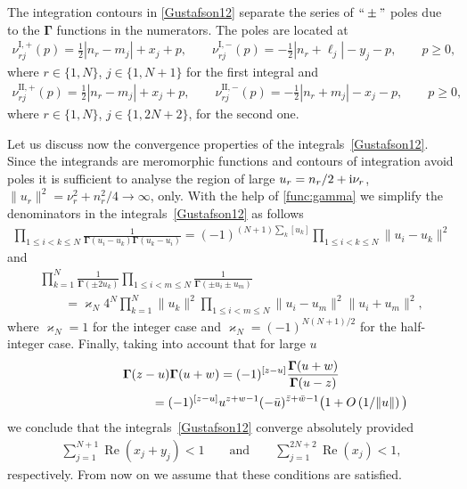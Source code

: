 \documentclass[pdftex]{sigma}
\numberwithin{equation}{section}
\begin{document}
The integration contours in \eqref{Gustafson12} separate the series of $``\pm"$ poles due to the $\boldsymbol \Gamma$ functions in the numerators. The poles are located at
\begin{gather}\label{poles-I}
\nu^{\text{I},+}_{rj}(p)=\frac12{|n_r-m_j|} +x_j +p, \qquad \nu^{\text{I},-}_{rj}(p)=-\frac12{|n_r+\ell_j|} -y_j -p,
\qquad p\geq 0,
\end{gather}
where $r\in\{1, N\}$, $j\in\{1,N+1\}$ for the first integral and
\begin{gather*}
\nu^{\text{II},+}_{rj}(p)=\frac12{|n_r-m_j|} +x_j +p, \qquad \nu^{\text{II},-}_{rj}(p)=-\frac12{|n_r+m_j|} -x_j -p,\qquad p\geq 0,
\end{gather*}
where $r\in\{1, N\}$, $j\in\{1,2N+2\}$, for the second one.

Let us discuss now the convergence properties of the integrals~\eqref{Gustafson12}. Since the integrands are meromorphic functions and contours of integration avoid poles
it is sufficient to analyse the region of large $u_r=n_r/2+ {\rm i}\nu_r$, $ \|u_r\|^2=\nu_r^2+n_r^2/4 \to\infty$, only.
With the help of \eqref{func:gamma} we simplify the denominators in the integrals~\eqref{Gustafson12} as follows
\begin{gather}\label{den1}
\prod_{1\leq i<k\leq N} \frac1{\boldsymbol{\Gamma}(u_i- u_k)\boldsymbol{\Gamma}(u_k- u_i)} = (-1)^{(N+1)\sum_k [u_k] } \prod_{1\leq i<k\leq N}\|u_i-u_k\|^2
\end{gather}
and
\begin{gather}
\prod_{k=1}^{N}\frac1{\boldsymbol{\Gamma}(\pm 2u_k)} \prod_{1\leq i<m\leq N}\frac1{\boldsymbol \Gamma (\pm u_i\pm u_m)}\nonumber\\
\qquad{} =\varkappa_N 4^{N} \prod_{k=1}^N \|u_k\|^2
\prod_{1\leq i<m\leq N}\|u_i-u_m\|^2\|u_i+u_m\|^2,\label{den2}
\end{gather}
where $\varkappa_N=1$ for the integer case and $\varkappa_N=(-1)^{N(N+1)/2}$ for the half-integer case. Finally, taking
into account that for large $u$
\begin{gather}
\boldsymbol \Gamma(z -u) \boldsymbol \Gamma(u+w) =
(-1)^{[z-u]}\frac{\boldsymbol{\Gamma}(u+w)}{\boldsymbol{\Gamma}(u-z)} \nonumber\\
\hphantom{\boldsymbol \Gamma(z -u) \boldsymbol \Gamma(u+w)}{} = (-1)^{[z-u]}
 u^{z+w-1} (-\bar u)^{\bar z+\bar w -1}\bigl(1+O\left(1/\|u\|\right)\bigl) \label{large-u-as}
\end{gather}
we conclude that the integrals~\eqref{Gustafson12} converge absolutely provided
\begin{gather}\label{convergence}
 \sum_{j=1}^{N+1} \operatorname{Re}(x_j+y_j) <1 \qquad \text{and} \qquad \sum_{j=1}^{2N+2} \operatorname{Re} (x_j) <1,
\end{gather}
respectively. From now on we assume that these conditions are satisfied.
\end{document}
